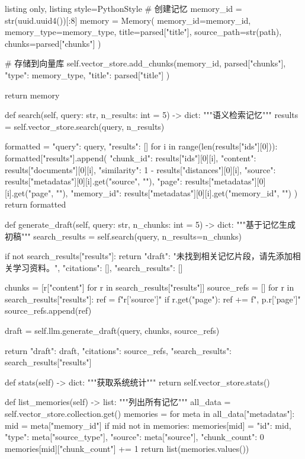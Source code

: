 \documentclass[12pt,a4paper,oneside]{article}
\begin{document}
\begin{tcblisting}{listing only, listing style=PythonStyle}
        # 创建记忆
        memory_id = str(uuid.uuid4())[:8]
        memory = Memory(
            memory_id=memory_id, memory_type=memory_type,
            title=parsed["title"], source_path=str(path),
            chunks=parsed["chunks"]
        )

        # 存储到向量库
        self.vector_store.add_chunks(memory_id, parsed["chunks"], {
            "type": memory_type, "title": parsed["title"]
        })

        return memory

    def search(self, query: str, n_results: int = 5) -> dict:
        """语义检索记忆"""
        results = self.vector_store.search(query, n_results)

        formatted = {"query": query, "results": []}
        for i in range(len(results["ids"][0])):
            formatted["results"].append({
                "chunk_id": results["ids"][0][i],
                "content": results["documents"][0][i],
                "similarity": 1 - results["distances"][0][i],
                "source": results["metadatas"][0][i].get("source", ""),
                "page": results["metadatas"][0][i].get("page", ""),
                "memory_id": results["metadatas"][0][i].get("memory_id", "")
            })
        return formatted

    def generate_draft(self, query: str, n_chunks: int = 5) -> dict:
        """基于记忆生成初稿"""
        search_results = self.search(query, n_results=n_chunks)

        if not search_results["results"]:
            return {"draft": "未找到相关记忆片段，请先添加相关学习资料。",
                    "citations": [], "search_results": []}

        chunks = [r["content"] for r in search_results["results"]]
        source_refs = []
        for r in search_results["results"]:
            ref = f"{r['source']}"
            if r.get("page"):
                ref += f", p.{r['page']}"
            source_refs.append(ref)

        draft = self.llm.generate_draft(query, chunks, source_refs)

        return {
            "draft": draft,
            "citations": source_refs,
            "search_results": search_results["results"]
        }

    def stats(self) -> dict:
        """获取系统统计"""
        return self.vector_store.stats()

    def list_memories(self) -> list:
        """列出所有记忆"""
        all_data = self.vector_store.collection.get()
        memories = {}
        for meta in all_data["metadatas"]:
            mid = meta["memory_id"]
            if mid not in memories:
                memories[mid] = {"id": mid, "type": meta["source_type"],
                                 "source": meta["source"], "chunk_count": 0}
            memories[mid]["chunk_count"] += 1
        return list(memories.values())
\end{tcblisting}
\end{document}
